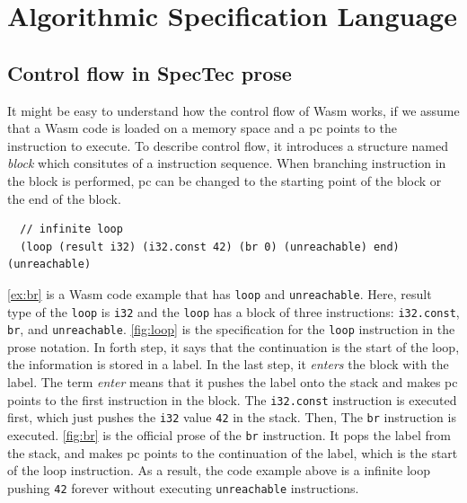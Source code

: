 \chapter{Algorithmic Specification Language}
\label{ch:Model}
\noindent

\section{Control flow in SpecTec prose}
\label{sec:spectecp}




\newcommand{\officialp}{official prose}
\newcommand{\spectecp}{SpecTec prose}

It might be easy to understand how the control flow of Wasm works, if we assume
that a Wasm code is loaded on a memory space and a pc points to the instruction
to execute.
To describe control flow, it introduces a structure named \textit{block} which
consitutes of a instruction sequence.
When branching instruction in the block is performed, pc can be changed to the
starting point of the block or the end of the block.


\begin{example}
\label{ex:br}
\begin{verbatim}
  // infinite loop
  (loop (result i32) (i32.const 42) (br 0) (unreachable) end) (unreachable)
\end{verbatim}
\end{example}

\cref{ex:br} is a Wasm code example that has \texttt{loop} and
\texttt{unreachable}.
Here, result type of the \texttt{loop} is \texttt{i32} and the \texttt{loop}
has a block of three instructions: \texttt{i32.const}, \texttt{br}, and
\texttt{unreachable}.
\cref{fig:loop} is the specification for the \texttt{loop} instruction in the
prose notation.
In forth step, it says that the continuation is the start of the loop, the
information is stored in a label.
In the last step, it \textit{enters} the block with the label.
The term \textit{enter} means that it pushes the label onto the stack and makes
pc points to the first instruction in the block.
The \texttt{i32.const} instruction is executed first, which just pushes the
\texttt{i32} value \texttt{42} in the stack.
Then, The \texttt{br} instruction is executed.
\cref{fig:br} is the \officialp{} of the \texttt{br} instruction.
It pops the label from the stack, and makes pc points to the continuation of
the label, which is the start of the loop instruction.
As a result, the code example above is a infinite loop pushing \texttt{42}
forever without executing \texttt{unreachable} instructions.

